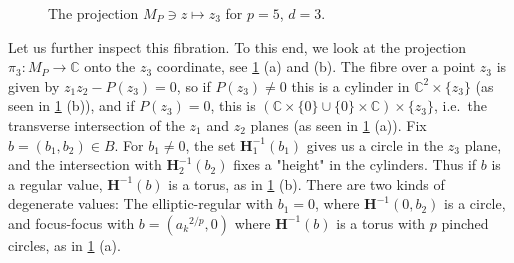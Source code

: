 \documentclass[12pt,a4paper,draft]{scrartcl}
\begin{document}
\begin{figure}
  \caption{The projection $M_P ∋ z ↦ z_3$ for $p=5$, $d=3$.}
  \label{fig:conic_fibration}
\end{figure}

Let us further inspect this fibration. To this end, we look at the projection $π_3 \colon M_P → ℂ$ onto the $z_3$ coordinate, see \cref{fig:conic_fibration} (a) and (b).
The fibre over a point $z_3$ is given by $z_1 z_2 - P(z_3) = 0$, so if $P(z_3) ≠ 0$ this is a cylinder in $ℂ^2 × \{z_3\}$ (as seen in \cref{fig:conic_fibration} (b)), and if $P(z_3) = 0$, this is $(ℂ × \{0\} ∪ \{0\} × ℂ) × \{z_3\}$, i.e.\ the transverse intersection of the $z_1$ and $z_2$ planes (as seen in \cref{fig:conic_fibration} (a)).
Fix $b = (b_1,b_2) ∈ B$. For $b_1 ≠ 0$, the set $\symbf{H}_1^{-1}(b_1)$ gives us a circle in the $z_3$ plane, and the intersection with $\symbf{H}_2^{-1}(b_2)$ fixes a "height" in the cylinders.
Thus if $b$ is a regular value, $\symbf{H}^{-1}(b)$ is a torus, as in \cref{fig:conic_fibration} (b).
There are two kinds of degenerate values: The elliptic-regular with $b_1=0$, where $\symbf{H}^{-1}(0,b_2)$ is a circle, and focus-focus with $b = ({a_k}^{2/p},0)$ where $\symbf{H}^{-1}(b)$ is a torus with $p$ pinched circles, as in \cref{fig:conic_fibration} (a). 
\end{document}
